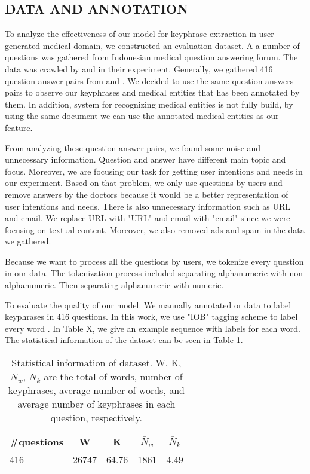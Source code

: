 \subsection{DATA AND ANNOTATION}
To analyze the effectiveness of our model for keyphrase extraction in user-generated medical domain, we constructed an evaluation dataset. A a number of questions was gathered from Indonesian medical question answering forum. The data was crawled by \cite{skripsiKakRadit} and \cite{skripsiWahid} in their experiment. Generally, we gathered 416 question-answer pairs from \cite{skripsiKakRadit} and \cite{skripsiWahid}. We decided to use the same question-answers pairs to observe our keyphrases and medical entities that has been annotated by them. In addition, system for recognizing medical entities is not fully build, by using the same document we can use the annotated medical entities as our feature.

From analyzing these question-answer pairs, we found some noise and unnecessary information. Question and answer have different main topic and focus. Moreover, we are focusing our task for getting user intentions and needs in our experiment. Based on that problem, we only use questions by users and remove answers by the doctors because it would be a better representation of user intentions and needs. There is also unnecessary information such as URL and email. We replace URL with "URL"  and email with "email" since we were focusing on textual content. Moreover, we also removed ads and spam in the data we gathered.

Because we want to process all the questions by users, we tokenize every question in our data. The tokenization process included separating alphanumeric with non-alphanumeric. Then separating alphanumeric with numeric. 

To evaluate the quality of our model. We manually annotated or data to label keyphrases in 416 questions. In this work, we use "IOB" tagging scheme to label every word \cite{collobert2011natural}. In Table X, we give an example sequence with labels for each word. The statistical information of the dataset can be seen in Table \ref{tab:descriptive_stats}.
\begin{table}
	\caption{Statistical information of dataset. W, K, $\bar{N}_{w}$, $\bar{N}_{k}$ are the total of words, number of keyphrases, average number of words, and average number of keyphrases in each question, respectively.}
	\label{tab:descriptive_stats}
	\begin{tabular}{lcccc}
		\toprule
		\#questions&W&K&$\bar{N}_{w}$&$\bar{N}_{k}$\\
		\midrule
		416 & 26747  & 64.76 & 1861 & 4.49 \\
		
		\bottomrule
	\end{tabular}
\end{table}
